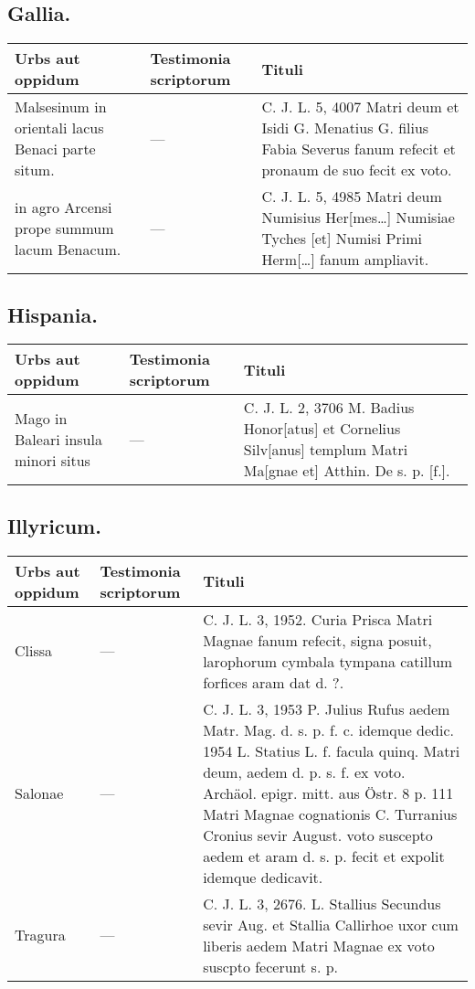 \documentclass[a4paper, 11pt, oneside, polutonikogreek, german]{article}
\begin{document}
\subsection{Gallia.}
\begin{table}[H]
    \centering
    \begin{tabular}{|p{30mm}|p{20mm}|p{60mm}|}
    \hline
        Urbs aut oppidum & Testimonia scriptorum & Tituli \\ \hline
        Malsesinum in orientali lacus Benaci parte situm. & --- & C. J. L. 5, 4007 Matri deum et Isidi G. Menatius G. filius Fabia Severus fanum refecit et pronaum de suo fecit ex voto. \\ \hline
        in agro Arcensi prope summum lacum Benacum. & --- & C. J. L. 5, 4985 Matri deum Numisius Her[mes…] Numisiae Tyches [et] Numisi Primi Herm[…] fanum ampliavit. \\ \hline
    \end{tabular}
\end{table}
\subsection{Hispania.}
\begin{table}[H]
    \centering
    \begin{tabular}{|p{30mm}|p{20mm}|p{60mm}|}
    \hline
        Urbs aut oppidum & Testimonia scriptorum & Tituli \\ \hline
        Mago in Baleari insula minori situs & --- & C. J. L. 2, 3706 M. Badius Honor[atus] et Cornelius Silv[anus] templum Matri Ma[gnae et] Atthin. De s. p. [f.]. \\ \hline
    \end{tabular}
\end{table}
\subsection{Illyricum.}
\begin{table}[H]
    \centering
    \begin{tabular}{|p{30mm}|p{20mm}|p{60mm}|}
    \hline
        Urbs aut oppidum & Testimonia scriptorum & Tituli \\ \hline
        Clissa & --- & C. J. L. 3, 1952. Curia Prisca Matri Magnae fanum refecit, signa posuit, larophorum cymbala tympana catillum forfices aram dat d. ?. \\ \hline
        Salonae & --- & C. J. L. 3, 1953 P. Julius Rufus aedem Matr. Mag. d. s. p. f. c. idemque dedic. 1954 L. Statius L. f. facula quinq. Matri deum, aedem d. p. s. f. ex voto. Archäol. epigr. mitt. aus Östr. 8 p. 111 Matri Magnae cognationis C. Turranius Cronius sevir August. voto suscepto aedem et aram d. s. p. fecit et expolit idemque dedicavit. \\ \hline
        Tragura & --- & C. J. L. 3, 2676. L. Stallius Secundus sevir Aug. et Stallia Callirhoe uxor cum liberis aedem Matri Magnae ex voto suscpto fecerunt s. p. \\ \hline
    \end{tabular}
\end{table}
\end{document}
